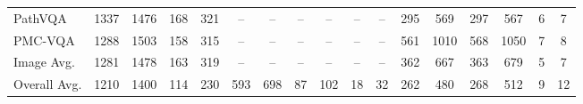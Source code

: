 \begin{table}[t]
{\begin{tabular}{l cc cc cc cc cc | cc cc cc}
PathVQA
& 1337 & 1476 & 168 & 321 & -- & -- & -- & --
& -- & -- & 295 & 569 & 297 & 567 & 6 & 7 \\

PMC-VQA
& 1288 & 1503 & 158 & 315 & -- & -- & -- & --
& -- & -- & 561 & 1010 & 568 & 1050 & 7 & 8 \\

\midrule
Image Avg.
& 1281 & 1478
& 163 & 319
& -- & --
& -- & --
& -- & --
& 362 & 667
& 363 & 679
& 5 & 7 \\
\midrule

Overall Avg.
& 1210 & 1400
& 114 & 230
& 593 & 698
& 87 & 102
& 18 & 32
& 262 & 480
& 268 & 512
& 9 & 12 \\

\bottomrule
\end{tabular}
}
\end{table}